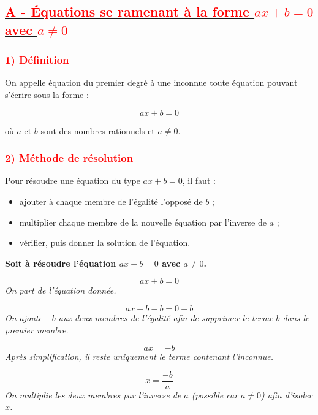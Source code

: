 \documentclass[12pt,a4paper]{article}
\begin{document}
\subsection*{\underline{\textcolor{red}{A - Équations se ramenant à la forme $ax + b = 0$ avec $a \neq 0$}}}

\vspace{0.3cm}

\subsubsection*{\textcolor{red}{1) Définition}}

On appelle équation du premier degré à une inconnue toute équation pouvant s’écrire sous la forme :

\[
ax + b = 0
\]

où $a$ et $b$ sont des nombres rationnels et $a \neq 0$.

\vspace{0.4cm}

\subsubsection*{\textcolor{red}{2) Méthode de résolution}}

Pour résoudre une équation du type $ax + b = 0$, il faut :

\begin{itemize}
    \item[\textcolor{red}{\checkmark}] ajouter à chaque membre de l’égalité l’opposé de $b$ ;
    \item[\textcolor{red}{\checkmark}] multiplier chaque membre de la nouvelle équation par l’inverse de $a$ ;
    \item[\textcolor{red}{\checkmark}] vérifier, puis donner la solution de l’équation.
\end{itemize}

\vspace{0.4cm}

\textbf{Soit à résoudre l’équation $ax + b = 0$ avec $a \neq 0$.}

\[
ax + b = 0
\]
\textit{On part de l’équation donnée.}

\[
ax + b - b = 0 - b
\]
\textit{On ajoute $-b$ aux deux membres de l’égalité afin de supprimer le terme $b$ dans le premier membre.}

\[
ax = -b
\]
\textit{Après simplification, il reste uniquement le terme contenant l’inconnue.}

\[
x = \frac{-b}{a}
\]
\textit{On multiplie les deux membres par l’inverse de $a$ (possible car $a \neq 0$) afin d’isoler $x$.}
\end{document}
